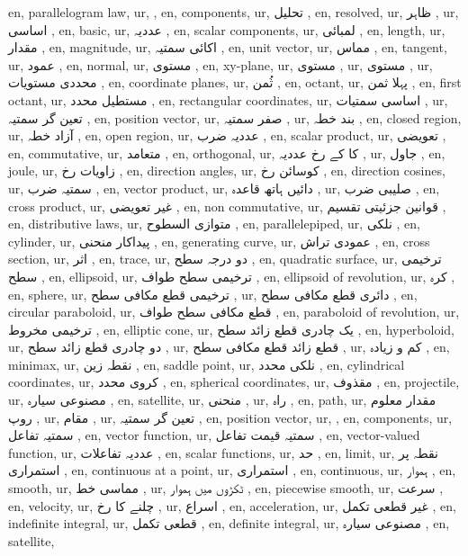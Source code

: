 en, parallelogram law,
ur,   ,
en, components,
ur, تحلیل  ,
en, resolved,
ur, ظاہر  ,
ur, اساسی ,
en, basic,
ur, عددیہ  ,
en, scalar components,
ur, لمبائی ,
en, length,
ur, مقدار ,
en, magnitude,
ur, اکائی سمتیہ ,
en, unit vector,
ur, مماس ,
en, tangent,
ur, عمود ,
en, normal,
ur, مستوی  ,
en, xy-plane,
ur, مستوی  ,
ur, مستوی  ,
ur, محددی مستویات ,
en, coordinate planes,
ur, ثُمن ,
en, octant,
ur, پہلا ثمن ,
en, first octant,
ur, مستطیل محدد ,
en, rectangular coordinates,
ur, اساسی سمتیات ,
ur, تعین گر سمتیہ ,
en, position vector,
ur, صفر سمتیہ ,
ur, بند خطہ  ,
en, closed region,
ur, آزاد خطہ  ,
en, open region,
ur, عددیہ ضرب ,
en, scalar product,
ur, تعویضی ,
en, commutative,
ur, متعامد ,
en, orthogonal,
ur,  کا  کے رخ عددیہ  ,
ur, جاول ,
en, joule,
ur, زاویات رخ  ,
en, direction angles,
ur, کوسائن رخ ,
en, direction cosines,
ur, سمتیہ ضرب ,
en, vector product,
ur, دائیں ہاتھ قاعدہ ,
ur, صلیبی ضرب ,
en, cross product,
ur, غیر تعویضی ,
en, non commutative,
ur, قوانین جزئیتی تقسیم  ,
en, distributive laws,
ur, متوازی السطوح  ,
en, parallelepiped,
ur, نلکی ,
en, cylinder,
ur, پیداکار منحنی ,
en, generating curve,
ur, عمودی تراش ,
en, cross section,
ur, اثر ,
en, trace,
ur, دو درجہ سطح  ,
en, quadratic surface,
ur,  ترخیمی سطح ,
en, ellipsoid,
ur,  ترخیمی سطح طواف ,
en, ellipsoid of revolution,
ur, کرہ  ,
en, sphere,
ur, ترخیمی قطع مکافی سطح ,
ur, دائری قطع مکافی سطح  ,
en, circular paraboloid,
ur, قطع مکافی سطح طواف ,
en, paraboloid of revolution,
ur, ترخیمی مخروط ,
en, elliptic cone,
ur, یک چادری قطع زائد سطح ,
en, hyperboloid,
ur, دو چادری قطع زائد سطح  ,
ur, قطع زائد قطع مکافی سطح ,
ur, کم و زیادہ ,
en, minimax,
ur,  نقطہ زین ,
en, saddle point,
ur, نلکی محدد ,
en, cylindrical coordinates,
ur, کروی محدد ,
en, spherical coordinates,
ur, مقذوف ,
en, projectile,
ur, مصنوعی سیارہ  ,
en, satellite,
ur, منحنی ,
ur, راہ ,
en, path,
ur, مقدار معلوم روپ  ,
ur,  مقام ,
ur,  تعین گر سمتیہ ,
en, position vector,
ur,  ,
en, components,
ur, سمتیہ تفاعل ,
en, vector function,
ur, سمتیہ قیمت تفاعل ,
en, vector-valued function,
ur, عددیہ تفاعلات ,
en, scalar functions,
ur, حد ,
en, limit,
ur,  نقطہ پر استمراری ,
en, continuous at a point,
ur, استمراری ,
en, continuous,
ur, ہموار ,
en, smooth,
ur, مماسی خط ,
ur, ٹکڑوں میں ہموار ,
en, piecewise smooth,
ur, سرعت ,
en, velocity,
ur, چلنے کا رخ ,
ur, اسراع ,
en, acceleration,
ur, غیر قطعی تکمل ,
en, indefinite integral,
ur, قطعی تکمل  ,
en, definite integral,
ur, مصنوعی سیارہ  ,
en, satellite,
